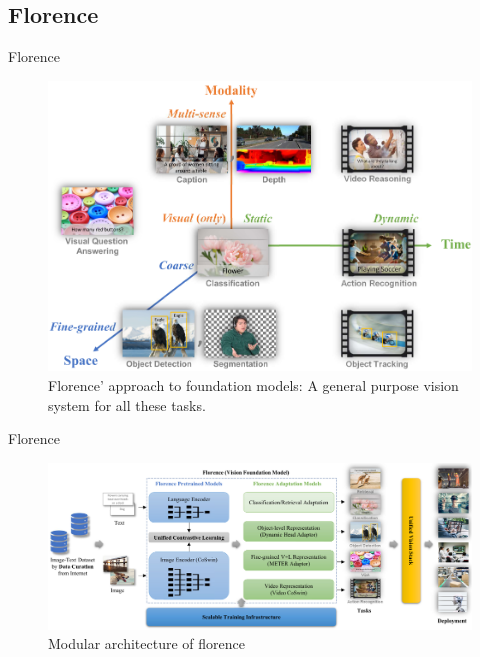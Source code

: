 \documentclass[xcolor=dvipsnames]{beamer}
\begin{document}
\subsection{Florence} %
\begin{frame}{Florence \parencite{yuan2021florence}}
  \begin{figure}[ht]
    \centering
    \includegraphics[width=0.7\linewidth]{../../figures/02-04-text-support-img/florence-dimensions}
    \caption{Florence' approach to foundation models: A general purpose vision system for all these tasks.}
  \end{figure}
\end{frame}

\begin{frame}{Florence \parencite{yuan2021florence}}
  \begin{figure}[ht]
    \centering
    \includegraphics[width=1\linewidth]{../../figures/02-04-text-support-img/florence-architecture}
    \caption{Modular architecture of florence}
  \end{figure}
\end{frame}
\end{document}
